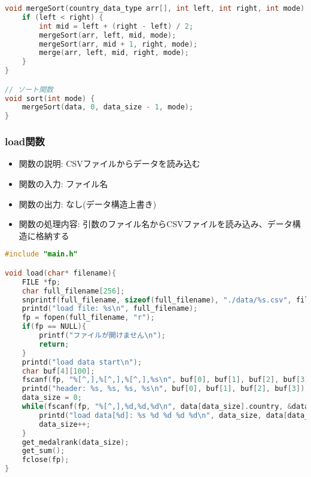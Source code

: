 \documentclass[a4paper,11pt]{jsarticle}
\begin{document}
\begin{lstlisting}[caption=マージソート関数, label=sort3, language=C]
void mergeSort(country_data_type arr[], int left, int right, int mode) {
    if (left < right) {
        int mid = left + (right - left) / 2;
        mergeSort(arr, left, mid, mode);
        mergeSort(arr, mid + 1, right, mode);
        merge(arr, left, mid, right, mode);
    }
}

// ソート関数
void sort(int mode) {
    mergeSort(data, 0, data_size - 1, mode);
}
\end{lstlisting}


\subsubsection*{load関数}
\begin{itemize}
    \item 関数の説明: CSVファイルからデータを読み込む
    \item 関数の入力: ファイル名
    \item 関数の出力: なし(データ構造上書き)
    \item 関数の処理内容: 引数のファイル名からCSVファイルを読み込み、データ構造に格納する
\end{itemize}
\begin{lstlisting}[caption=load関数のコード, label=load, language=C]
#include "main.h"

void load(char* filename){
    FILE *fp;
    char full_filename[256];
    snprintf(full_filename, sizeof(full_filename), "./data/%s.csv", filename);
    printd("load file: %s\n", full_filename);
    fp = fopen(full_filename, "r");
    if(fp == NULL){
        printf("ファイルが開けません\n");
        return;
    }
    printd("load data start\n");
    char buf[4][100];
    fscanf(fp, "%[^,],%[^,],%[^,],%s\n", buf[0], buf[1], buf[2], buf[3]);
    printd("header: %s, %s, %s, %s\n", buf[0], buf[1], buf[2], buf[3]);
    data_size = 0;
    while(fscanf(fp, "%[^,],%d,%d,%d\n", data[data_size].country, &data[data_size].gold, &data[data_size].silver, &data[data_size].bronze) != EOF){
        printd("load data[%d]: %s %d %d %d %d\n", data_size, data[data_size].country, data[data_size].gold, data[data_size].silver, data[data_size].bronze, data[data_size].medal_rank);
        data_size++;
    }
    get_medalrank(data_size);
    get_sum();
    fclose(fp);
}
\end{lstlisting}

\newpage
\end{document}
